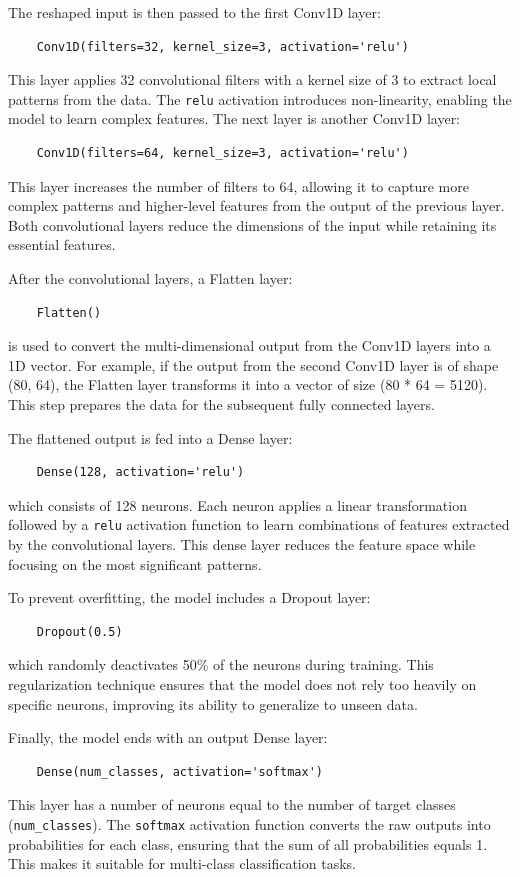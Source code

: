 The reshaped input is then passed to the first Conv1D layer:
\begin{lstlisting}
	Conv1D(filters=32, kernel_size=3, activation='relu')
\end{lstlisting}

This layer applies 32 convolutional filters with a kernel size of 3 to extract local patterns from the data. The \verb|relu| activation introduces non-linearity, enabling the model to learn complex features. The next layer is another Conv1D layer:
\begin{lstlisting}
	Conv1D(filters=64, kernel_size=3, activation='relu')
\end{lstlisting}
This layer increases the number of filters to 64, allowing it to capture more complex patterns and higher-level features from the output of the previous layer. Both convolutional layers reduce the dimensions of the input while retaining its essential features.

After the convolutional layers, a Flatten layer:
\begin{lstlisting}
	Flatten()
\end{lstlisting}
is used to convert the multi-dimensional output from the Conv1D layers into a 1D vector. For example, if the output from the second Conv1D layer is of shape (80, 64), the Flatten layer transforms it into a vector of size (80 * 64 = 5120). This step prepares the data for the subsequent fully connected layers.

The flattened output is fed into a Dense layer:
\begin{lstlisting}
	Dense(128, activation='relu')
\end{lstlisting}

which consists of 128 neurons. Each neuron applies a linear transformation followed by a \verb|relu| activation function to learn combinations of features extracted by the convolutional layers. This dense layer reduces the feature space while focusing on the most significant patterns.

To prevent overfitting, the model includes a Dropout layer:
\begin{lstlisting}
	Dropout(0.5)
\end{lstlisting}
which randomly deactivates 50\% of the neurons during training. This regularization technique ensures that the model does not rely too heavily on specific neurons, improving its ability to generalize to unseen data.

Finally, the model ends with an output Dense layer:
\begin{lstlisting}
	Dense(num_classes, activation='softmax')
\end{lstlisting}
This layer has a number of neurons equal to the number of target classes (\verb|num_classes|). The \verb|softmax| activation function converts the raw outputs into probabilities for each class, ensuring that the sum of all probabilities equals 1. This makes it suitable for multi-class classification tasks.


